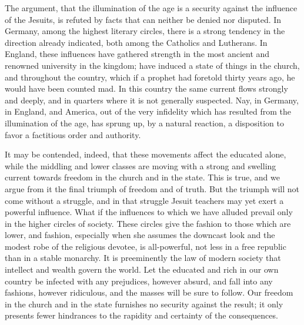 \documentclass[]{book}
\begin{document}
The argument, that the illumination of the age is a security against the influence of the Jesuits, is refuted by facts that can neither be denied nor disputed. In Germany, among the highest literary circles, there is a strong tendency in the direction already indicated, both among the Catholics and Lutherans. In England, these influences have gathered strength in the most ancient and renowned university in the kingdom; have induced a state of things in the church, and throughout the country, which if a prophet had foretold thirty years ago, he would have been counted mad. In this country the same current flows strongly and deeply, and in quarters where it is not generally suspected. Nay, in Germany, in England, and America, out of the very infidelity which has resulted from the illumination of the age, has sprung up, by a natural reaction, a disposition to favor a factitious order and authority.

It may be contended, indeed, that these movements affect the educated alone, while the middling and lower classes are moving with a strong and swelling current towards freedom in the church and in the state. This is true, and we argue from it the final triumph of freedom and of truth. But the triumph will not come without a struggle, and in that struggle Jesuit teachers may yet exert a powerful influence. What if the influences to which we have alluded prevail only in the higher circles of society. These circles give the fashion to those which are lower, and fashion, especially when she assumes the downcast look and the modest robe of the religious devotee, is all-powerful, not less in a free republic than in a stable monarchy. It is preeminently the law of modern society that intellect and wealth govern the world. Let the educated and rich in our own country be infected with any prejudices, however absurd, and fall into any fashions, however ridiculous, and the masses will be sure to follow. Our freedom in the church and in the state furnishes no security against the result; it only presents fewer hindrances to the rapidity and certainty of the consequences.
\end{document}
